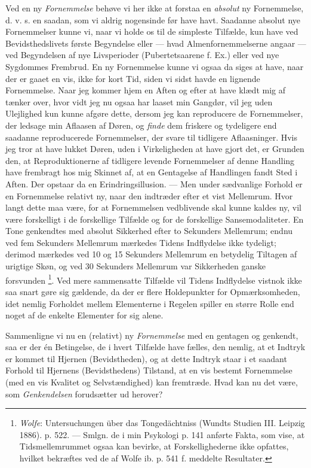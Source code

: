 \documentclass[12pt,a4paper,openany]{book}
\newcommand{\opage}[1]{\marginnote{\footnotesize\textit{[#1]}}}
\begin{document}
Ved en ny \emph{Fornemmelse} behøve vi her ikke at forstaa en \emph{absolut} ny
Fornemmelse, d. v. s. en saadan, som vi aldrig nogensinde før have havt.
Saadanne absolut
\setcounter{footnote}{0}%
\opage{11}nye Fornemmelser kunne vi, naar vi holde os til de simpleste
Tilfælde, kun have ved Bevidsthedslivets første Begyndelse eller --- hvad
Almenfornemmelserne angaar --- ved Begyndelsen af nye Livsperioder
(Pubertetsaarene f. Ex.) eller ved nye Sygdommes Frembrud. En ny Fornemmelse
kunne vi ogsaa da siges at have, naar der er gaaet en vis, ikke for kort Tid,
siden vi sidst havde en lignende Fornemmelse. Naar jeg kommer hjem en Aften og
efter at have klædt mig af tænker over, hvor vidt jeg nu ogsaa har laaset min
Gangdør, vil jeg uden Ulejlighed kun kunne afgøre dette, dersom jeg kan
reproducere de Fornemmelser, der ledsage min Aflaasen af Døren, og \emph{finde}
dem friskere og tydeligere end saadanne reproducerede Fornemmelser, der svare
til tidligere Aflaasninger. Hvis jeg tror at have lukket Døren, uden i
Virkeligheden at have gjort det, er Grunden den, at Reproduktionerne af
tidligere levende Fornemmelser af denne Handling have frembragt hos mig Skinnet
af, at en Gentagelse af Handlingen fandt Sted i Aften. Der opstaar da en
Erindringsillusion. --- Men under sædvanlige Forhold er en Fornemmelse relativt
ny, naar den indtræder efter et vist Mellemrum. Hvor langt dette maa være, for
at Fornemmelsen vedblivende skal kunne kaldes ny, vil være forskelligt i de
forskellige Tilfælde og for de forskellige Sansemodaliteter. En Tone genkendtes
med absolut Sikkerhed efter to Sekunders Mellemrum; endnu ved fem Sekunders
Mellemrum mærkedes Tidens Indflydelse ikke tydeligt; derimod mærkedes ved 10 og
15 Sekunders Mellemrum en betydelig Tiltagen af urigtige Skøn, og ved 30
Sekunders Mellemrum var Sikkerheden ganske forsvunden%
\footnote[1]{\emph{Wolfe}: Untersuchungen über das Tongedächtniss (Wundts
Studien III. Leipzig 1886). p. 522. --- Smlgn. de i min Psykologi p. 141
anførte Fakta, som vise, at Tidsmellemrummet ogsaa kan bevirke, at
Forskellighederne ikke opfattes, hvilket bekræftes ved de af Wolfe ib. p. 541
f. meddelte Resultater.}. Ved mere sammensatte Tilfælde vil Tidens Indflydelse
vistnok ikke saa snart gøre sig gældende, da der er flere Holdepunkter for
Opmærksomheden, idet nemlig Forholdet mellem Elementerne i Regelen spiller en
større Rolle end noget af de enkelte Elementer for sig alene.

Sammenligne vi nu en (relativt) ny \emph{Fornemmelse} med en gentagen og
genkendt, saa er der én Betingelse, de i hvert Tilfælde have fælles, den
nemlig, at et Indtryk er kommet til Hjernen (Bevidstheden), og at dette Indtryk
staar i et saadant Forhold til Hjernens (Bevidsthedens) Tilstand, at en vis
bestemt Fornemmelse (med en vis Kvalitet og Selvstændighed) kan fremtræde. Hvad
kan nu det være, som \emph{Genkendelsen} forudsætter ud herover?
\end{document}
